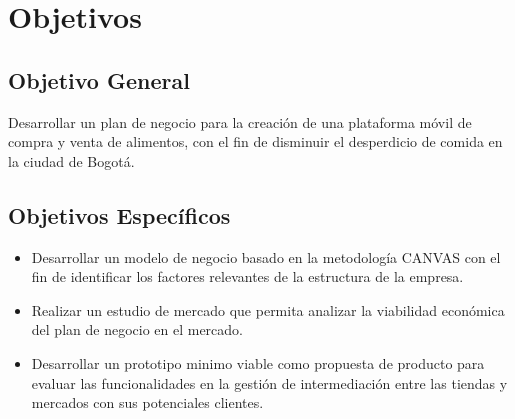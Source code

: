 \section{Objetivos}

\subsection{Objetivo General}

Desarrollar un plan de negocio para la creación de una 
plataforma móvil de compra y venta de alimentos, con el fin de disminuir el desperdicio de comida en la ciudad de Bogotá.

\subsection{Objetivos Específicos}
\begin{itemize}
    \item Desarrollar un modelo de negocio basado en la metodología CANVAS con el fin de identificar los factores relevantes de la estructura de la empresa.
    \item Realizar un estudio de mercado que permita analizar la viabilidad económica del plan de negocio en el mercado.
    \item Desarrollar un prototipo minimo viable como propuesta de producto para evaluar las funcionalidades en la gestión de intermediación entre las tiendas y mercados con sus potenciales clientes.  

\end{itemize}
